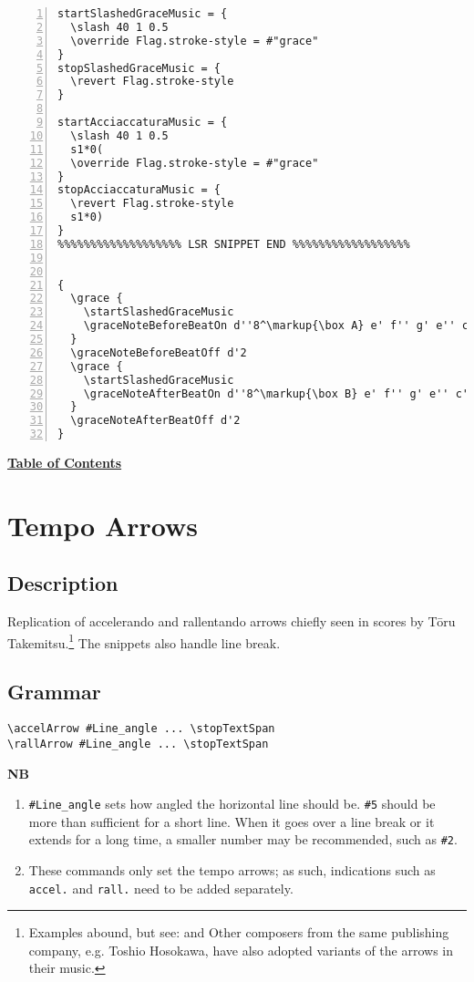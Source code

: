 \begin{Verbatim}[numbers=left,xleftmargin=5mm]
startSlashedGraceMusic = {
  \slash 40 1 0.5
  \override Flag.stroke-style = #"grace"
}
stopSlashedGraceMusic = {
  \revert Flag.stroke-style
}

startAcciaccaturaMusic = {
  \slash 40 1 0.5
  s1*0(
  \override Flag.stroke-style = #"grace"
}
stopAcciaccaturaMusic = {
  \revert Flag.stroke-style
  s1*0)
}
%%%%%%%%%%%%%%%%%%% LSR SNIPPET END %%%%%%%%%%%%%%%%%%


{
  \grace {
    \startSlashedGraceMusic
    \graceNoteBeforeBeatOn d''8^\markup{\box A} e' f'' g' e'' c'
  }
  \graceNoteBeforeBeatOff d'2
  \grace {
    \startSlashedGraceMusic
    \graceNoteAfterBeatOn d''8^\markup{\box B} e' f'' g' e'' c'
  }
  \graceNoteAfterBeatOff d'2
}
\end{Verbatim}

\hyperref[sec:toc]{\textbf{Table of Contents}}

\vfill \break



\section {Tempo Arrows}
\hfill
{}
\hfill

\subsection{Description}

Replication of accelerando and rallentando arrows chiefly seen in scores by Tōru Takemitsu.\footnote{Examples abound, but see: \cite{RN1736} and \cite{RN1735} Other composers from the same publishing company, e.g. Toshio Hosokawa, have also adopted variants of the arrows in their music.} The snippets also handle line break.

\subsection{Grammar}
\begin{verbatim}
\accelArrow #Line_angle ... \stopTextSpan
\rallArrow #Line_angle ... \stopTextSpan
\end{verbatim}


\textbf{NB} 
\begin{enumerate}
\item \verb|#Line_angle| sets how angled the horizontal line should be. \verb|#5| should be more than sufficient for a short line.  When it goes over a line break or it extends for a long time, a smaller number may be recommended, such as \verb|#2|. 
\item These commands only set the tempo arrows; as such, indications such as \verb|accel.| and \verb|rall.| need to be added separately. 
\end{enumerate}

